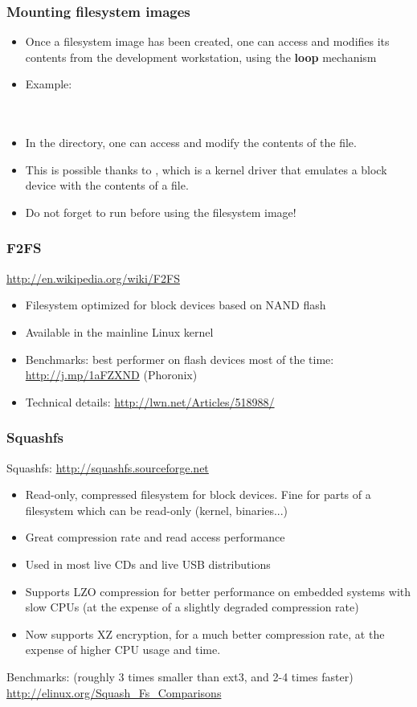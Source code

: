 \begin{frame}
  \frametitle{Mounting filesystem images}
  \begin{itemize}
  \item Once a filesystem image has been created, one can access and
    modifies its contents from the development workstation, using the
    {\bf loop} mechanism
  \item Example:\\
    \\
    \\
  \item In the  directory, one can access and modify
    the contents of the  file.
  \item This is possible thanks to , which is a kernel
    driver that emulates a block device with the contents of a file.
  \item Do not forget to run  before using the filesystem
    image!
  \end{itemize}
\end{frame}

\begin{frame}
  \frametitle{F2FS}
  \url{http://en.wikipedia.org/wiki/F2FS}
  \begin{itemize}
  \item Filesystem optimized for block devices based on NAND flash
  \item Available in the mainline Linux kernel
  \item Benchmarks: best performer on flash devices most of the time: \\
        \url{http://j.mp/1aFZXND} (Phoronix) 
  \item Technical details: \url{http://lwn.net/Articles/518988/}
  \end{itemize}
\end{frame}

\begin{frame}
  \frametitle{Squashfs}
  Squashfs: \url{http://squashfs.sourceforge.net}
  \begin{itemize}
  \item Read-only, compressed filesystem for block devices. Fine for
    parts of a filesystem which can be read-only (kernel, binaries...)
  \item Great compression rate and read access performance
  \item Used in most live CDs and live USB distributions
  \item Supports LZO compression for better performance on embedded
    systems with slow CPUs (at the expense of a slightly degraded
    compression rate)
  \item Now supports XZ encryption, for a much better compression rate,
        at the expense of higher CPU usage and time.
  \end{itemize}
  Benchmarks: (roughly 3 times smaller than ext3, and 2-4 times faster)\\
  \url{http://elinux.org/Squash_Fs_Comparisons}
\end{frame}

